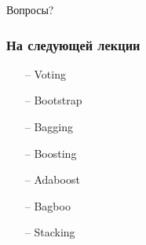 \documentclass[10pt]{beamer}
\begin{document}
\begin{frame}[standout]
  Вопросы?
\end{frame}

\appendix

\begin{frame}\frametitle{На следующей лекции}
	\begin{itemize}
    	\item[--] Voting
    	\item[--] Bootstrap
    	\item[--] Bagging
    	\item[--] Boosting
    	\item[--] Adaboost
    	\item[--] Bagboo
    	\item[--] Stacking
	\end{itemize}
\end{frame}
\end{document}
